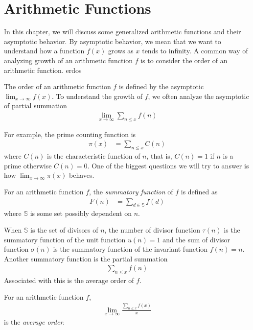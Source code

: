 \documentclass[elemannt.tex]{subfile}
\begin{document}
	\chapter{Arithmetic Functions}\label{ch:arith}
	In this chapter, we will discuss some generalized arithmetic functions and their asymptotic behavior. By asymptotic behavior, we mean that we want to understand how a function $f(x)$ grows as $x$ tends to infinity. A common way of analyzing growth of an arithmetic function $f$ is to consider the order of an arithmetic function. \gls{erdos}
		\begin{definition}
			The order of an arithmetic function $f$ is defined by the asymptotic $\lim_{x\to\infty}f(x)$. To understand the growth of $f$, we often analyze the asymptotic of partial summation
				\begin{align*}
					\lim\limits_{x\to\infty}\sum_{n\leq x}f(n)
				\end{align*}
		\end{definition}
	For example, the prime counting function is
		\begin{align*}
			\pi(x)
				& = \sum_{n\leq x}C(n)
		\end{align*}
	where $C(n)$ is the characteristic function of $n$, that is, $C(n)=1$ if $n$ is a prime otherwise $C(n)=0$. One of the biggest questions we will try to answer is how $\lim_{x\to\infty}\pi(x)$ behaves.
		\begin{definition}
			For an arithmetic function $f$, the \textit{summatory function} of $f$ is defined as
				\begin{align*}
					F(n)
						& = \sum_{d\in \mathbb{S}}f(d)
				\end{align*}
			where $\mathbb{S}$ is some set possibly dependent on $n$.
		\end{definition}
	When $\mathbb{S}$ is the set of divisors of $n$, the number of divisor function $\tau(n)$ is the summatory function of the unit function $u(n)=1$ and the sum of divisor function $\sigma(n)$ is the summatory function of the invariant function $f(n)=n$. Another summatory function is the partial summation
		\begin{align*}
			\sum_{n\leq x}f(n)
		\end{align*}
	Associated with this is the average order of $f$.
		\begin{definition}
			 For an arithmetic function $f$,
				\begin{align*}
					\lim\limits_{x\to\infty}\frac{\sum_{n\leq x}f(x)}{x}
				\end{align*}
			is the \textit{average order}.
		\end{definition}
\end{document}
